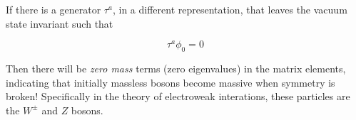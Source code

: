 \noindent If there is a generator $\tau^a$, in a different representation, that leaves the vacuum state invariant such that

\begin{equation}
\tau^a \phi_0 = 0
\end{equation}

\noindent Then there will be \textit{zero mass} terms (zero eigenvalues) in the matrix elements, indicating that initially massless bosons become massive when symmetry is broken! Specifically in the theory of electroweak interations, these particles are the $W^{\pm}$ and $Z$ bosons.